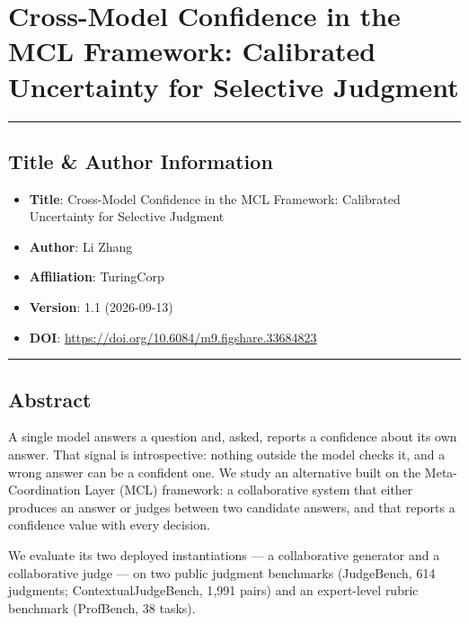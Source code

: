 \documentclass[
]{article}
\providecommand{\tightlist}{%
  \setlength{\itemsep}{0pt}\setlength{\parskip}{0pt}}
\begin{document}
\section{Cross-Model Confidence in the MCL Framework: Calibrated Uncertainty for Selective Judgment}\label{title}

\begin{center}\rule{0.5\linewidth}{0.5pt}\end{center}

\subsection{Title \& Author Information}\label{title-author-information}

\begin{itemize}
\tightlist
\item
  \textbf{Title}: Cross-Model Confidence in the MCL Framework: Calibrated Uncertainty for Selective Judgment
\item
  \textbf{Author}: Li Zhang
\item
  \textbf{Affiliation}: TuringCorp
\item
  \textbf{Version}: 1.1 (2026-09-13)
\item
  \textbf{DOI}: \url{https://doi.org/10.6084/m9.figshare.33684823}
\end{itemize}

\begin{center}\rule{0.5\linewidth}{0.5pt}\end{center}

\subsection{Abstract}\label{abstract}

A single model answers a question and, asked, reports a confidence about its own answer.
That signal is introspective: nothing outside the model checks it, and a wrong answer can
be a confident one. We study an alternative built on the Meta-Coordination Layer (MCL)
framework: a collaborative system that either produces an answer or judges between two
candidate answers, and that reports a confidence value with every decision.

We evaluate its two deployed instantiations --- a collaborative generator and a
collaborative judge --- on two public judgment benchmarks (JudgeBench, 614 judgments;
ContextualJudgeBench, 1{,}991 pairs) and an expert-level rubric benchmark (ProfBench, 38
tasks).
\end{document}
